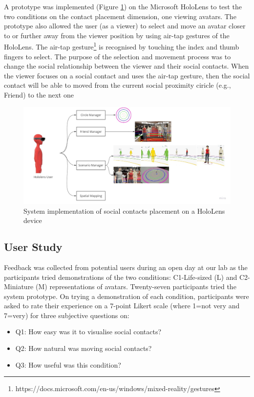 A prototype was implemented (Figure \ref{fig:placement:system}) on the Microsoft HoloLens to test the two conditions on the contact placement dimension, one viewing avatars. The prototype also allowed the user (as a viewer) to select and move an avatar closer to or further away from the viewer position by using air-tap gestures of the HoloLens. The air-tap gesture\footnote{https://docs.microsoft.com/en-us/windows/mixed-reality/gestures} is recognised by touching the index and thumb fingers to select. The purpose of the selection and movement process was to change the social relationship between the viewer and their social contacts. When the viewer focuses on a social contact and uses the air-tap gesture, then the social contact will be able to moved from the current social proximity ciricle (e.g., Friend) to the next one

\begin{figure}[ht]
    \centering
    \includegraphics[width=\linewidth]{images/42-placement-ismar17/placement-system.jpg}   
    \caption{System implementation of social contacts placement on a HoloLens device} 
    \label{fig:placement:system}
\end{figure}


\subsection{User Study}

Feedback was collected from potential users during an open day at our lab as the participants tried demonstrations of the two conditions: C1-Life-sized (L) and C2-Miniature (M) representations of avatars. Twenty-seven participants tried the system prototype. On trying a demonstration of each condition, participants were asked to rate their experience on a 7-point Likert scale (where 1=not very and 7=very) for three subjective questions on: 

\begin{itemize}
    \item Q1: How easy was it to visualise social contacts?
    \item Q2: How natural was moving social contacts?
    \item Q3: How useful was this condition?
\end{itemize}

